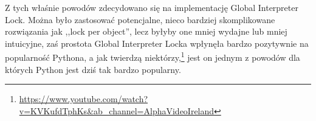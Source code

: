 Z tych właśnie powodów zdecydowano się na implementację Global Interpreter Lock. Można było zastosować potencjalne, nieco bardziej skomplikowane rozwiązania jak ,,lock per object'', lecz byłyby one mniej wydajne lub mniej intuicyjne, zaś prostota Global Interpreter Locka wpłynęła bardzo pozytywnie na popularność Pythona, a jak twierdzą niektórzy,\footnote{\url{https://www.youtube.com/watch?v=KVKufdTphKs&ab_channel=AlphaVideoIreland}} jest on jednym z powodów dla których Python jest dziś tak bardzo popularny.
